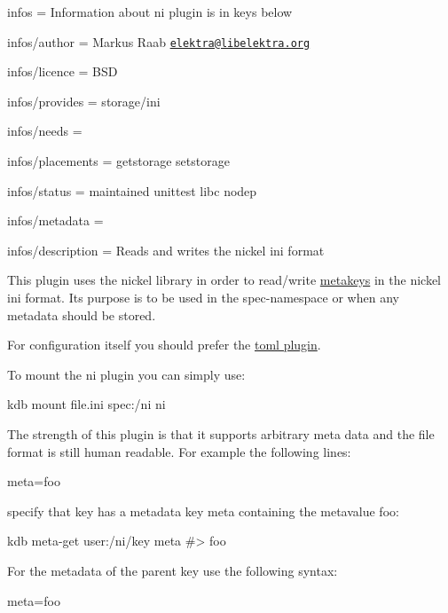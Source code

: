 
\begin{DoxyItemize}
\item infos = Information about ni plugin is in keys below
\item infos/author = Markus Raab \href{mailto:elektra@libelektra.org}{\tt elektra@libelektra.\+org}
\item infos/licence = B\+SD
\item infos/provides = storage/ini
\item infos/needs =
\item infos/placements = getstorage setstorage
\item infos/status = maintained unittest libc nodep
\item infos/metadata =
\item infos/description = Reads and writes the nickel ini format
\end{DoxyItemize}

This plugin uses the nickel library in order to read/write \hyperlink{doc_help_elektra-metadata_md}{metakeys} in the nickel ini format. Its purpose is to be used in the {\ttfamily spec}-\/namespace or when any metadata should be stored.

For configuration itself you should prefer the \hyperlink{autotoc_md642_src_plugins_toml_README_md}{toml plugin}.

To mount the ni plugin you can simply use\+:


\begin{DoxyCode}
kdb mount file.ini spec:/ni ni
\end{DoxyCode}


The strength of this plugin is that it supports arbitrary meta data and the file format is still human readable. For example the following lines\+:


\begin{DoxyCode}
[key]
meta=foo
\end{DoxyCode}


specify that {\ttfamily key} has a metadata key {\ttfamily meta} containing the metavalue {\ttfamily foo}\+:


\begin{DoxyCode}
kdb meta-get user:/ni/key meta
#> foo
\end{DoxyCode}


For the metadata of the parent key use the following syntax\+:


\begin{DoxyCode}
[]
meta=foo
\end{DoxyCode}


